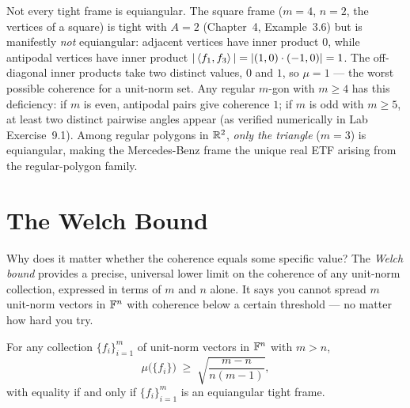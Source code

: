 \begin{remark*}
Not every tight frame is equiangular. The square frame ($m=4$, $n=2$,
the vertices of a square) is tight with $A=2$ (Chapter~4, Example~3.6)
but is manifestly \emph{not} equiangular: adjacent vertices have inner
product $0$, while antipodal vertices have inner product $|\left\langle f_1, f_3 \right\rangle|
= |(1,0)\cdot(-1,0)| = 1$. The off-diagonal inner products take two
distinct values, $0$ and $1$, so $\mu = 1$ --- the worst possible
coherence for a unit-norm set. Any regular $m$-gon with $m\ge4$ has
this deficiency: if $m$ is even, antipodal pairs give coherence $1$;
if $m$ is odd with $m\ge5$, at least two distinct pairwise angles appear
(as verified numerically in Lab Exercise~9.1). Among regular polygons
in $\mathbb{R}^2$, \emph{only the triangle} ($m=3$) is equiangular, making the
Mercedes-Benz frame the unique real ETF arising from the regular-polygon
family.
\end{remark*}

\section{The Welch Bound}
\label{sec:welch-bound}

Why does it matter whether the coherence equals some specific value?
The \emph{Welch bound} provides a precise, universal lower limit on the
coherence of any unit-norm collection, expressed in terms of $m$ and $n$
alone. It says you cannot spread $m$ unit-norm vectors in $\mathbb{F}^n$ with
coherence below a certain threshold --- no matter how hard you try.

\begin{theorem}
\label{thm:welch-bound}
For any collection $\{f_i\}_{i=1}^m$ of unit-norm vectors in $\mathbb{F}^n$
with $m>n$,
\[
  \mu\bigl(\{f_i\}\bigr)
  \;\ge\;
  \sqrt{\frac{m-n}{n(m-1)}},
\]
with equality if and only if $\{f_i\}_{i=1}^m$ is an equiangular tight
frame.
\end{theorem}

